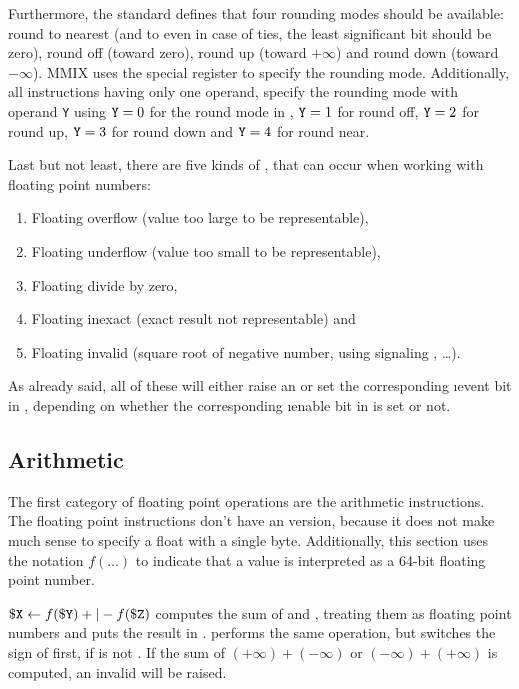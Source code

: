 Furthermore, the standard defines that four rounding modes should be available: round to nearest (and to even in case of ties, \ie the least significant bit should be zero), round off (toward zero), round up (toward $+\infty$) and round down (toward $-\infty$). MMIX uses the special register  to specify the rounding mode. Additionally, all instructions having only one operand, specify the rounding mode with operand {\tt Y} using ${\tt Y}=0$ for the round mode in , ${\tt Y}=1$ for round off, ${\tt Y}=2$ for round up, ${\tt Y}=3$ for round down and ${\tt Y}=4$ for round near. \citep[pg. 15 and 21]{mmix-doc}

Last but not least, there are five kinds of , that can occur when working with floating point numbers:
\begin{enumerate}
	\item Floating overflow (value too large to be representable),
	\item Floating underflow (value too small to be representable),
	\item Floating divide by zero,
	\item Floating inexact (exact result not representable) and
	\item Floating invalid (square root of negative number, using signaling \NaN, \dots).
\end{enumerate}
As already said, all of these will either raise an  or set the corresponding \i{event bit} in , depending on whether the corresponding \i{enable bit} in  is set or not. \citep[pg. 15]{mmix-doc}

\subsection{Arithmetic}

The first category of floating point operations are the arithmetic instructions. The floating point instructions don't have an  version, because it does not make much sense to specify a float with a single byte. Additionally, this section uses the notation $f(\dots)$ to indicate that a value is interpreted as a 64-bit floating point number.

\instrtbl
	{}
	{${\tt \$X} \leftarrow f({\tt \$Y}) +|- f({\tt \$Z})$}
\noindent {} computes the sum of  and , treating them as floating point numbers and puts the result in .  performs the same operation, but switches the sign of  first, if  is not \NaN. If the sum of $(+\infty)+(-\infty)$ or $(-\infty)+(+\infty)$ is computed, an invalid  will be raised. \citep[pg. 16]{mmix-doc}

